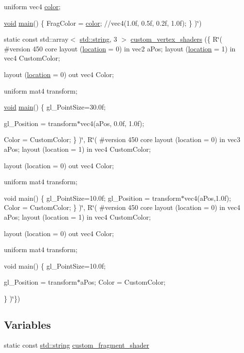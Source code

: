 \begin{DoxyCompactItemize}
uniform vec4 \mbox{\hyperlink{glad_8h_a69995a929d818b8b467d4593c24d98bc}{color}};

\mbox{\hyperlink{glad_8h_a950fc91edb4504f62f1c577bf4727c29}{void}} \mbox{\hyperlink{gtest__tests_8cpp_a3c04138a5bfe5d72780bb7e82a18e627}{main}}()
\{
Frag\+Color = \mbox{\hyperlink{glad_8h_a69995a929d818b8b467d4593c24d98bc}{color}}; //vec4(1.\+0f, 0.\+5f, 0.\+2f, 1.\+0f);
\}
)\char`\"{})
\item 
static const std\+::array$<$ \mbox{\hyperlink{glad_8h_ac83513893df92266f79a515488701770}{std\+::string}}, 3 $>$ \mbox{\hyperlink{namespaceshaders_af0c4e80907c12bdbec8be7e450017f42}{custom\+\_\+vertex\+\_\+shaders}} (\{ R\char`\"{}(
\#version 450 core
layout (\mbox{\hyperlink{glad_8h_a6f0165ed903f22b8bb600c3e0b628e73}{location}} = 0) in vec2 a\+Pos;
layout (\mbox{\hyperlink{glad_8h_a6f0165ed903f22b8bb600c3e0b628e73}{location}} = 1) in vec4 Custom\+Color;

layout (\mbox{\hyperlink{glad_8h_a6f0165ed903f22b8bb600c3e0b628e73}{location}} = 0) out vec4 Color;

uniform mat4 transform;

\mbox{\hyperlink{glad_8h_a950fc91edb4504f62f1c577bf4727c29}{void}} \mbox{\hyperlink{gtest__tests_8cpp_a3c04138a5bfe5d72780bb7e82a18e627}{main}}()
\{
gl\+\_\+\+Point\+Size=30.\+0f;

gl\+\_\+\+Position = transform$\ast$vec4(a\+Pos, 0.\+0f, 1.\+0f);

\+Color = Custom\+Color;
\}
)\char`\"{}, R\char`\"{}(
\#version 450 core
layout (location = 0) in vec3 a\+Pos;
layout (location = 1) in vec4 Custom\+Color;

layout (location = 0) out vec4 Color;

uniform mat4 transform;

void main()
\{
gl\+\_\+\+Point\+Size=10.\+0f;
gl\+\_\+\+Position = transform$\ast$vec4(a\+Pos,1.\+0f);
\+Color = Custom\+Color;
\}
)\char`\"{}, R\char`\"{}(
\#version 450 core
layout (location = 0) in vec4 a\+Pos;
layout (location = 1) in vec4 Custom\+Color;

layout (location = 0) out vec4 Color;

uniform mat4 transform;

void main()
\{
gl\+\_\+\+Point\+Size=10.\+0f;

gl\+\_\+\+Position = transform$\ast$a\+Pos;
\+Color = Custom\+Color;

\}
)\char`\"{}\})
\end{DoxyCompactItemize}
\subsection*{Variables}
\begin{DoxyCompactItemize}
\item 
static const \mbox{\hyperlink{glad_8h_ac83513893df92266f79a515488701770}{std\+::string}} \mbox{\hyperlink{namespaceshaders_acea5f97c6eee2604b26ca2c01a42018b}{custom\+\_\+fragment\+\_\+shader}}
\end{DoxyCompactItemize}


